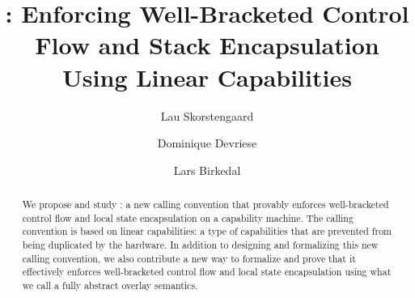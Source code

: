 \documentclass[acmsmall,screen]{acmart}\settopmatter{}
\begin{document}
\title[\stktokens{}: Enforcing Well-Bracketed Control Flow and Stack Encapsulation Using \ldots]{\stktokens{}: Enforcing Well-Bracketed Control Flow and Stack Encapsulation Using Linear Capabilities}


\author{Lau Skorstengaard}

\author{Dominique Devriese}

\author{Lars Birkedal}

\begin{abstract}
  We propose and study \stktokens{}: a new calling convention that provably enforces well-bracketed control flow and local state encapsulation on a capability machine.
  The calling convention is based on linear capabilities: a type of capabilities that are prevented from being duplicated by the hardware.
  In addition to designing and formalizing this new calling convention, we also contribute a new way to formalize and prove that it effectively enforces well-bracketed control flow and local state encapsulation using what we call a fully abstract overlay semantics.
\end{abstract}


\end{document}
